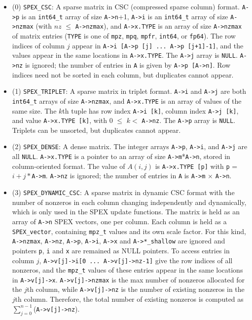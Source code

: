 \documentclass[12pt]{report}
\theoremstyle{definition}
\begin{document}
\begin{itemize}
\item
 (0) \verb|SPEX_CSC|:  A sparse matrix in CSC (compressed sparse column) format.
      \verb|A->p| is an \verb|int64_t| array of size \verb|A->n|+1, \verb|A->i|
      is an \verb|int64_t| array of size \verb|A->nzmax| (with $nz$ $\le$
      \verb|A->nzmax|), and \verb|A->x.TYPE| is an array of size
      \verb|A->nzmax| of matrix entries (\verb'TYPE' is one of \verb|mpz|,
      \verb|mpq|, \verb|mpfr|, \verb|int64|, or \verb|fp64|).  The row indices
      of column $j$ appear in \verb|A->i [A->p [j] ... A->p [j+1]-1]|, and the
      values appear in the same locations in \verb|A->x.TYPE|.  The \verb|A->j|
      array is \verb|NULL|.  \verb|A->nz| is ignored; the number of entries in
      \verb|A| is given by \verb|A->p [A->n]|.
      Row indices need not be sorted in each column, but duplicates cannot
      appear.

\item
 (1) \verb|SPEX_TRIPLET|:  A sparse matrix in triplet format.  \verb|A->i| and
     \verb|A->j| are both \verb|int64_t| arrays of size \verb|A->nzmax|, and
     \verb|A->x.TYPE| is an array of values of the same size.  The $k$th tuple
     has row index \verb|A->i [k]|, column index \verb|A->j [k]|, and value
     \verb|A->x.TYPE [k]|, with 0 $\le$ $k <$ \verb|A->nz|.
     The \verb|A->p| array is \verb|NULL|.
     Triplets can be unsorted, but duplicates cannot appear.

\item
 (2) \verb|SPEX_DENSE|:  A dense matrix.  The integer arrays \verb|A->p|,
     \verb|A->i|, and \verb|A->j| are all \verb|NULL|.  \verb|A->x.TYPE| is a
     pointer to an array of size \verb|A->m|*\verb|A->n|, stored in
     column-oriented format.  The value of $A(i,j)$ is \verb|A->x.TYPE [p]|
     with \verb|p| = $i + j*$\verb|A->m|.  \verb|A->nz| is ignored; the number
     of entries in \verb|A| is \verb|A->m| $\times$ \verb|A->n|.

\item
 (3) \verb|SPEX_DYNAMIC_CSC|: A sparse matrix in dynamic CSC
     format with the number of nonzeros in each column changing
     independently and dynamically, which is only used in the SPEX update
     functions. The matrix is held as an array of \verb|A->n| SPEX vectors, one per
     column. Each column is held as a \verb|SPEX_vector|, containing \verb|mpz_t| values
     and its own scale factor.  For this kind, \verb|A->nzmax|, \verb|A->nz|, \verb|A->p|, \verb|A->i|,
     \verb|A->x| and \verb|A->*_shallow| are ignored and pointers \verb|p|, \verb|i| and \verb|x| are remained
     as NULL pointers. To access entries in column $j$, \verb|A->v[j]->i[0 ... A->v[j]->nz-1]|
     give the row indices of all nonzeros, and the \verb|mpz_t| values
     of these entries appear in the same locations in \verb|A->v[j]->x|.
     \verb|A->v[j]->nzmax| is the max number of nonzeros allocated for the $j$th column, while \verb|A->v[j]->nz| is the number of existing nonzeros in the $j$th column. Therefore, the total number
     of existing nonzeros is computed as $\sum_{j=0}^{n-1}$(\verb|A->v[j]->nz|).


\end{itemize}
\end{document}
